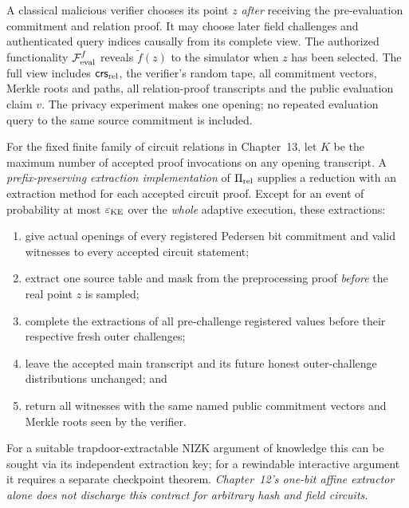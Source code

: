 \begin{definition}\label{def:security14:zk-game}
A classical malicious verifier chooses its
point $z$ \emph{after} receiving the
pre-evaluation commitment and relation proof.
It may choose later field challenges and
authenticated query indices causally from
its complete view. The authorized
functionality
$\mathcal F_{\rm eval}^f$ reveals
$\widetilde f(z)$ to the simulator
when $z$ has been selected.
The full view includes
$\mathsf{crs}_{\rm rel}$, the verifier's
random tape, all commitment vectors,
Merkle roots and paths, all relation-proof
transcripts and the public evaluation
claim $v$. The privacy experiment makes
one opening; no repeated evaluation query
to the same source commitment is included.
\end{definition}

\begin{definition}\label{def:security14:extract-contract}
For the fixed finite family of circuit
relations in Chapter~13, let $K$ be the
maximum number of accepted proof invocations
on any opening transcript.
A \emph{prefix-preserving extraction
implementation} of $\Pi_{\rm rel}$ supplies
a reduction with an extraction method for
each accepted circuit proof. Except for
an event of probability at most
$\varepsilon_{\rm KE}$ over the \emph{whole}
adaptive execution, these extractions:
\begin{enumerate}[label=\textup{(\roman*)}]
\item give actual openings of every
registered Pedersen bit commitment and
valid witnesses to every accepted circuit
statement;
\item extract one source table and mask
from the preprocessing proof \emph{before}
the real point $z$ is sampled;
\item complete the extractions of all
pre-challenge registered values before
their respective fresh outer challenges;
\item leave the accepted main transcript
and its future honest outer-challenge
distributions unchanged; and
\item return all witnesses with the same
named public commitment vectors and
Merkle roots seen by the verifier.
\end{enumerate}
For a suitable trapdoor-extractable NIZK
argument of knowledge this can be sought
via its independent extraction key;
for a rewindable interactive argument it
requires a separate checkpoint theorem.
\emph{Chapter~12's one-bit affine extractor
alone does not discharge this contract
for arbitrary hash and field circuits.}
\end{definition}

